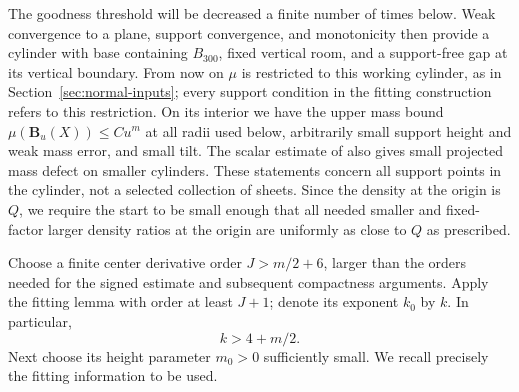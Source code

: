 The goodness threshold will be decreased a finite number of times below.
Weak convergence to a plane, support convergence, and monotonicity then
provide a cylinder with base containing $B_{300}$, fixed vertical room,
and a support-free gap at its vertical boundary. From now on $\mu$
is restricted to this working cylinder, as in
Section~\ref{sec:normal-inputs}; every support condition in the fitting
construction refers to this restriction. On its interior we have
the upper mass bound $\mu(\mathbf B_u(X))\le C u^m$ at all radii used
below, arbitrarily small support height and weak mass error, and small
tilt. The scalar estimate of \cite[Lemma~2.5]{AE} also gives small
projected mass defect on smaller cylinders. These statements concern
all support points in the cylinder, not a selected collection of sheets.
Since the density at the origin is $Q$, we require the start to be small
enough that all needed smaller and fixed-factor larger density ratios
at the origin are uniformly as close to $Q$ as prescribed.

Choose a finite center derivative order $J>m/2+6$, larger than the orders
needed for the signed estimate and subsequent compactness arguments.
Apply the fitting lemma with order at least $J+1$; denote its exponent
$k_0$ by $k$. In particular,
\begin{equation}\label{eq:fitting-order}
 k>4+m/2.
\end{equation}
Next choose its height parameter $m_0>0$ sufficiently small. We recall
precisely the fitting information to be used.

